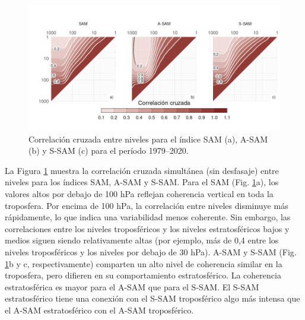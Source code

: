 \documentclass[12pt,oneside,a4paper]{reedthesis}
\begin{document}
\begin{figure}

{\centering \includegraphics{figures/30-sam/cross-correlation-1} 

}

\caption{Correlación cruzada entre niveles para el índice SAM (a), A-SAM (b) y S-SAM (c) para el período 1979--2020.}\label{fig:cross-correlation}
\end{figure}

La Figura \ref{fig:cross-correlation} muestra la correlación cruzada simultánea (sin desfasaje) entre niveles para los índices SAM, A-SAM y S-SAM.
Para el SAM (Fig. \ref{fig:cross-correlation}a), los valores altos por debajo de 100 hPa reflejan coherencia vertical en toda la troposfera.
Por encima de 100 hPa, la correlación entre niveles disminuye más rápidamente, lo que indica una variabilidad menos coherente.
Sin embargo, las correlaciones entre los niveles troposféricos y los niveles estratosféricos bajos y medios siguen siendo relativamente altas (por ejemplo, más de 0,4 entre los niveles troposféricos y los niveles por debajo de 30 hPa).
A-SAM y S-SAM (Fig. \ref{fig:cross-correlation}b y c, respectivamente) comparten un alto nivel de coherencia similar en la troposfera, pero difieren en su comportamiento estratosférico.
La coherencia estratosférica es mayor para el A-SAM que para el S-SAM.
El S-SAM estratosférico tiene una conexión con el S-SAM troposférico algo más intensa que el A-SAM estratosférico con el A-SAM troposférico.
\end{document}
